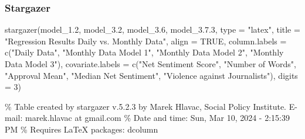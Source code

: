 \documentclass[
]{article}
\newenvironment{Shaded}{\begin{snugshade}}{\end{snugshade}}
\newcommand{\AttributeTok}[1]{\textcolor[rgb]{0.77,0.63,0.00}{#1}}
\newcommand{\ConstantTok}[1]{\textcolor[rgb]{0.00,0.00,0.00}{#1}}
\newcommand{\DecValTok}[1]{\textcolor[rgb]{0.00,0.00,0.81}{#1}}
\newcommand{\FloatTok}[1]{\textcolor[rgb]{0.00,0.00,0.81}{#1}}
\newcommand{\FunctionTok}[1]{\textcolor[rgb]{0.00,0.00,0.00}{#1}}
\newcommand{\NormalTok}[1]{#1}
\newcommand{\StringTok}[1]{\textcolor[rgb]{0.31,0.60,0.02}{#1}}
\begin{document}
\hypertarget{stargazer}{%
\subsubsection{Stargazer}\label{stargazer}}

\begin{Shaded}
\begin{Highlighting}[]
\FunctionTok{stargazer}\NormalTok{(model\_1}\FloatTok{.2}\NormalTok{, model\_3}\FloatTok{.2}\NormalTok{, model\_3}\FloatTok{.6}\NormalTok{, model\_3.}\FloatTok{7.3}\NormalTok{, }\AttributeTok{type =} \StringTok{"latex"}\NormalTok{,}
          \AttributeTok{title =} \StringTok{"Regression Results Daily vs. Monthly Data"}\NormalTok{,}
          \AttributeTok{align =} \ConstantTok{TRUE}\NormalTok{,}
          \AttributeTok{column.labels =} \FunctionTok{c}\NormalTok{(}\StringTok{"Daily Data"}\NormalTok{, }\StringTok{"Monthly Data Model 1"}\NormalTok{, }\StringTok{"Monthly Data Model 2"}\NormalTok{, }\StringTok{"Monthly Data Model 3"}\NormalTok{),}
          \AttributeTok{covariate.labels =} \FunctionTok{c}\NormalTok{(}\StringTok{"Net Sentiment Score"}\NormalTok{, }\StringTok{"Number of Words"}\NormalTok{, }\StringTok{"Approval Mean"}\NormalTok{, }\StringTok{"Median Net Sentiment"}\NormalTok{, }\StringTok{"Violence against Journalists"}\NormalTok{),}
          \AttributeTok{digits =} \DecValTok{3}\NormalTok{)}
\end{Highlighting}
\end{Shaded}

\% Table created by stargazer v.5.2.3 by Marek Hlavac, Social Policy
Institute. E-mail: marek.hlavac at gmail.com \% Date and time: Sun, Mar
10, 2024 - 2:15:39 PM \% Requires LaTeX packages: dcolumn
\end{document}
